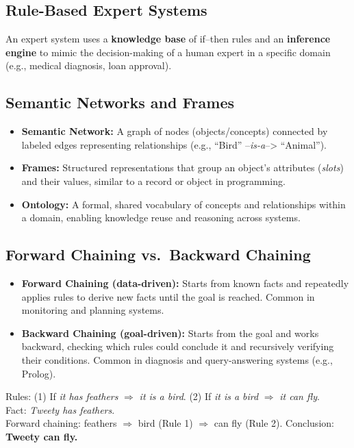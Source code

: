 \documentclass[11pt,a4paper]{article}
\begin{document}
\subsection{Rule-Based Expert Systems}
\begin{conceptbox}
An expert system uses a \textbf{knowledge base} of if--then rules and an \textbf{inference engine} to mimic the decision-making of a human expert in a specific domain (e.g., medical diagnosis, loan approval).
\end{conceptbox}

\subsection{Semantic Networks and Frames}
\begin{itemize}[leftmargin=*]
  \item \textbf{Semantic Network:} A graph of nodes (objects/concepts) connected by labeled edges representing relationships (e.g., ``Bird'' --\textit{is-a}--> ``Animal'').
  \item \textbf{Frames:} Structured representations that group an object's attributes (\textit{slots}) and their values, similar to a record or object in programming.
  \item \textbf{Ontology:} A formal, shared vocabulary of concepts and relationships within a domain, enabling knowledge reuse and reasoning across systems.
\end{itemize}

\subsection{Forward Chaining vs.\ Backward Chaining}
\begin{itemize}[leftmargin=*]
  \item \textbf{Forward Chaining (data-driven):} Starts from known facts and repeatedly applies rules to derive new facts until the goal is reached. Common in monitoring and planning systems.
  \item \textbf{Backward Chaining (goal-driven):} Starts from the goal and works backward, checking which rules could conclude it and recursively verifying their conditions. Common in diagnosis and query-answering systems (e.g., Prolog).
\end{itemize}

\begin{examplebox}
Rules: (1) If \textit{it has feathers} $\Rightarrow$ \textit{it is a bird}. (2) If \textit{it is a bird} $\Rightarrow$ \textit{it can fly}.\\
Fact: \textit{Tweety has feathers}.\\
Forward chaining: feathers $\Rightarrow$ bird (Rule 1) $\Rightarrow$ can fly (Rule 2). Conclusion: \textbf{Tweety can fly.}
\end{examplebox}
\end{document}
